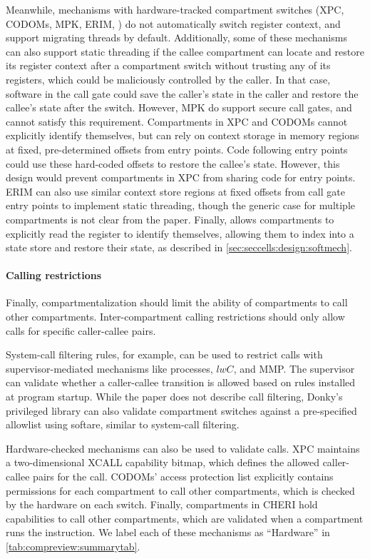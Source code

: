Meanwhile, mechanisms with hardware-tracked compartment switches
(XPC, CODOMs, MPK, ERIM, \seccells) do not automatically switch register
context, and support migrating threads by default.
Additionally, some of these mechanisms can also support static threading
if the callee compartment can locate and restore its register context 
after a compartment switch without trusting any of its registers, which could
be maliciously controlled by the caller.
In that case, software in the call gate could save the caller's state in the
caller and restore the callee's state after the switch.
However, MPK do support secure call gates, and cannot satisfy this requirement.
Compartments in XPC and CODOMs cannot explicitly identify themselves, but can
rely on context storage in memory regions at fixed, pre-determined offsets 
from entry points.
Code following entry points could use these hard-coded offsets to restore
the callee's state.
However, this design would prevent compartments in XPC from sharing code for
entry points.
ERIM can also use similar context store regions at fixed offsets from 
call gate entry points to implement static threading, though the generic 
case for multiple compartments is not clear from the paper.
Finally, \seccells allows compartments to explicitly read the \sid register
to identify themselves, allowing them to index into a state store and
restore their state, as described in \autoref{sec:seccells:design:softmech}.

\paragraph{Calling restrictions}
Finally, compartmentalization should limit the ability of compartments to 
call other compartments.
Inter-compartment calling restrictions should only allow calls for specific
caller-callee pairs.

System-call filtering rules, for example, can be used to restrict calls
with supervisor-mediated mechanisms like processes, $lwC$, and MMP.
The supervisor can validate whether a caller-callee transition is allowed
based on rules installed at program startup.
While the paper does not describe call filtering, Donky's privileged
library can also validate compartment switches against a pre-specified
allowlist using softare, similar to system-call filtering.

Hardware-checked mechanisms can also be used to validate calls.
XPC maintains a two-dimensional XCALL capability bitmap, which defines
the allowed caller-callee pairs for the call.
CODOMs' access protection list explicitly contains permissions for each
compartment to call other compartments, which is checked by the hardware
on each switch.
Finally, compartments in CHERI hold capabilities to call other compartments,
which are validated when a compartment runs the  instruction.
We label each of these mechanisms as ``Hardware'' in 
\autoref{tab:compreview:summarytab}. 

